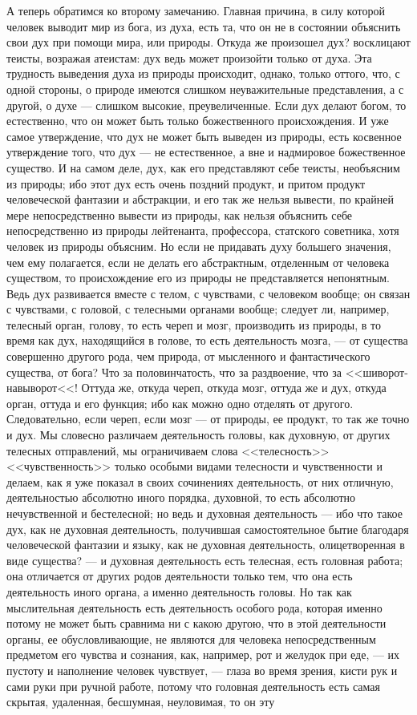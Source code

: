 \documentclass[12pt]{article}
\begin{document}
А теперь обратимся ко второму замечанию. Главная причина, в силу которой человек выводит мир из бога, из духа, есть та, что он не в состоянии объяснить свои дух при помощи мира, или природы. Откуда же произошел дух? восклицают теисты, возражая атеистам: дух ведь может произойти только от духа. Эта трудность выведения духа из природы происходит, однако, только оттого, что, с одной стороны, о природе имеются слишком неуважительные представления, а с другой, о духе --- слишком высокие, преувеличенные. Если дух делают богом, то естественно, что он может быть только божественного происхождения. И уже самое утверждение, что дух не может быть выведен из природы, есть косвенное утверждение того, что дух --- не естественное, а вне и надмировое божественное существо. И на самом деле, дух, как его представляют себе теисты, необъясним из природы; ибо этот дух есть очень поздний продукт, и притом продукт человеческой фантазии и абстракции, и его так же нельзя вывести, по крайней мере непосредственно вывести из природы, как нельзя объяснить себе непосредственно из природы лейтенанта, профессора, статского советника, хотя человек из природы объясним. Но если не придавать духу большего значения, чем ему полагается, если не делать его абстрактным, отделенным от человека существом, то происхождение его из природы не представляется непонятным. Ведь дух развивается вместе с телом, с чувствами, с человеком вообще; он связан с чувствами, с головой, с телесными органами вообще; следует ли, например, телесный орган, голову, то есть череп и мозг, производить из природы, в то время как дух, находящийся в голове, то есть деятельность мозга, --- от существа совершенно другого рода, чем природа, от мысленного и фантастического существа, от бога? Что за половинчатость, что за раздвоение, что за <<шиворот-навыворот<<! Оттуда же, откуда череп, откуда мозг, оттуда же и дух, откуда орган, оттуда и его функция; ибо как можно одно отделять от другого. Следовательно, если череп, если мозг --- от природы, ее продукт, то так же точно и дух. Мы словесно различаем деятельность головы, как духовную, от других телесных отправлений, мы ограничиваем слова <<телесность>>  <<чувственность>> только особыми видами телесности и чувственности и делаем, как я уже показал в своих сочинениях деятельность, от них отличную, деятельностью абсолютно иного порядка, духовной, то есть абсолютно нечувственной и бестелесной; но ведь и духовная деятельность --- ибо что такое дух, как не духовная деятельность, получившая самостоятельное бытие благодаря человеческой фантазии и языку, как не духовная деятельность, олицетворенная в виде существа? --- и духовная деятельность есть телесная, есть головная работа; она отличается от других родов деятельности только тем, что она есть деятельность иного органа, а именно деятельность головы. Но так как мыслительная деятельность есть деятельность особого рода, которая именно потому не может быть сравнима ни с какою другою, что в этой деятельности органы, ее обусловливающие, не являются для человека непосредственным предметом его чувства и сознания, как, например, рот и желудок при еде, --- их пустоту и наполнение человек чувствует, --- глаза во время зрения, кисти рук и сами руки при ручной работе, потому что головная деятельность есть самая скрытая, удаленная, бесшумная, неуловимая, то он эту 
\end{document}
